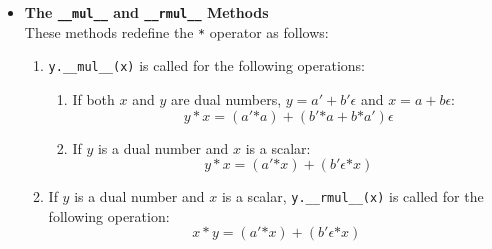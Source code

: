 \documentclass[a4paper,12pt]{article}
\begin{document}
\begin{itemize}
    \item \textbf{The \texttt{\_\_mul\_\_} and \texttt{\_\_rmul\_\_} Methods} \\
    These methods redefine the \texttt{*} operator as follows:
    \begin{enumerate}
        \item \texttt{y.\_\_mul\_\_(x)} is called for the following operations:
    \begin{enumerate}
        \item If both \(x\) and \(y\) are dual numbers, \(y = a' + b'\epsilon\) and \(x = a + b\epsilon\):
        \[
        y * x = (a' \texttt{*} a) + (b' \texttt{*} a + b \texttt{*} a')\epsilon
        \]
        \item If \(y\) is a dual number and \(x\) is a scalar:
        \[
        y * x = (a' \texttt{*} x) + (b'\epsilon \texttt{*} x)
        \]
    \end{enumerate}
        \item If \(y\) is a dual number and \(x\) is a scalar, \texttt{y.\_\_rmul\_\_(x)} is called for the following operation:
        \[
        x * y = (a' \texttt{*} x) + (b'\epsilon \texttt{*} x)
        \]
    \end{enumerate}


\end{itemize}
\end{document}
